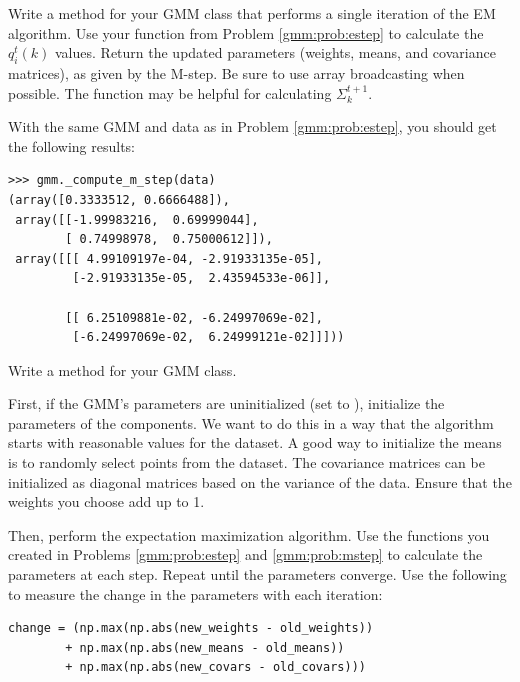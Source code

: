 \begin{problem}
\label{gmm:prob:mstep}
Write a method  for your GMM class that performs a single iteration of the EM algorithm.
Use your function from Problem \ref{gmm:prob:estep} to calculate the \(q_i^t(k)\) values.
Return the updated parameters (weights, means, and covariance matrices), as given by the M-step.
Be sure to use array broadcasting when possible. The function  may be helpful for calculating \(\Sigma_k^{t+1}\).

With the same GMM and data as in Problem \ref{gmm:prob:estep}, you should get the following results:
\begin{lstlisting}
>>> gmm._compute_m_step(data)
(array([0.3333512, 0.6666488]),
 array([[-1.99983216,  0.69999044],
        [ 0.74998978,  0.75000612]]),
 array([[[ 4.99109197e-04, -2.91933135e-05],
         [-2.91933135e-05,  2.43594533e-06]],

        [[ 6.25109881e-02, -6.24997069e-02],
         [-6.24997069e-02,  6.24999121e-02]]]))
\end{lstlisting}
\end{problem}

\begin{problem}
Write a  method for your GMM class.

First, if the GMM's parameters are uninitialized (set to ), initialize the parameters of the components.
We want to do this in a way that the algorithm starts with reasonable values for the dataset.
A good way to initialize the means is to randomly select points from the dataset.
The covariance matrices can be initialized as diagonal matrices based on the variance of the data.
Ensure that the weights you choose add up to 1.%

Then, perform the expectation maximization algorithm.
Use the functions you created in Problems \ref{gmm:prob:estep} and \ref{gmm:prob:mstep} to calculate the parameters at each step.
Repeat until the parameters converge.
Use the following to measure the change in the parameters with each iteration:
\begin{lstlisting}
change = (np.max(np.abs(new_weights - old_weights))
        + np.max(np.abs(new_means - old_means))
        + np.max(np.abs(new_covars - old_covars)))
\end{lstlisting}%
\end{problem}

